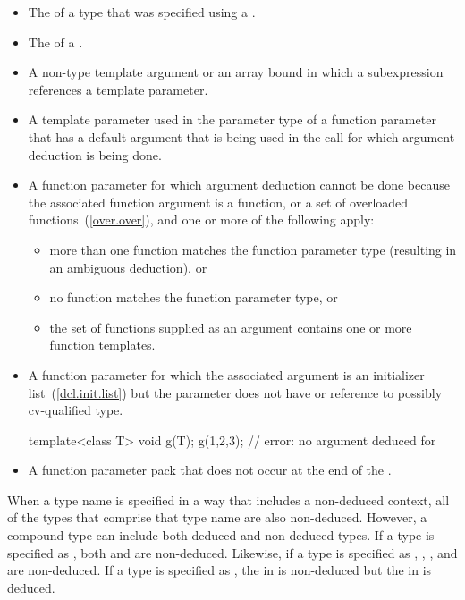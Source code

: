 %
\begin{itemize}
\item
The
of a type that was specified using a
.
\item
The  of a .
\item
A non-type template argument or an array bound in which a subexpression
references a template parameter.
\item
A template parameter used in the parameter type of a function parameter that
has a default argument that is being used in the call for which argument
deduction is being done.
\item
A function parameter for which argument deduction cannot be done because the
associated function argument is a function, or a set of overloaded
functions~(\ref{over.over}), and one or more of the following apply:
\begin{itemize}
\item
more than one function matches the function parameter type (resulting in
an ambiguous deduction), or
\item
no function matches the function parameter type, or
\item
the set of functions supplied as an argument contains one or more function templates.
\end{itemize}
\item A function parameter for which the associated argument is an initializer
list~(\ref{dcl.init.list}) but the parameter does not have
 or reference to possibly cv-qualified
 type. \enterexample
\begin{codeblock}
template<class T> void g(T);
g({1,2,3});                 // error: no argument deduced for 
\end{codeblock}
\exitexample
\item A function parameter pack that does not occur at the end of the 
.
\end{itemize}

\pnum
When a type name is specified in a way that includes a non-deduced
context, all of the types that comprise that type name are also
non-deduced.
However, a compound type can include both deduced and non-deduced types.
\enterexample
If a type is specified as
,
both
and
are non-deduced.
Likewise, if a type is specified as
,
,
,
and
are non-deduced.
If a type is specified as
,
the
in
is non-deduced but
the
in
is deduced.
\exitexample

